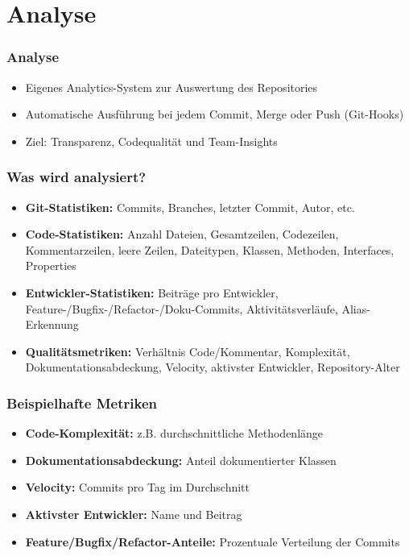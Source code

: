 \documentclass{beamer}
\begin{document}
\section{Analyse}
\begin{frame}
\frametitle{Analyse}

\begin{itemize}
  \item Eigenes Analytics-System zur Auswertung des Repositories
  \item Automatische Ausführung bei jedem Commit, Merge oder Push (Git-Hooks)
  \item Ziel: Transparenz, Codequalität und Team-Insights
\end{itemize}
\end{frame}

\begin{frame}
\frametitle{Was wird analysiert?}
\begin{itemize}
  \item \textbf{Git-Statistiken:} Commits, Branches, letzter Commit, Autor, etc.
  \item \textbf{Code-Statistiken:} Anzahl Dateien, Gesamtzeilen, Codezeilen, Kommentarzeilen, leere Zeilen, Dateitypen, Klassen, Methoden, Interfaces, Properties
  \item \textbf{Entwickler-Statistiken:} Beiträge pro Entwickler, Feature-/Bugfix-/Refactor-/Doku-Commits, Aktivitätsverläufe, Alias-Erkennung
  \item \textbf{Qualitätsmetriken:} Verhältnis Code/Kommentar, Komplexität, Dokumentationsabdeckung, Velocity, aktivster Entwickler, Repository-Alter
\end{itemize}
\end{frame}

\begin{frame}
\frametitle{Beispielhafte Metriken}
\begin{itemize}
  \item \textbf{Code-Komplexität:} z.B. durchschnittliche Methodenlänge
  \item \textbf{Dokumentationsabdeckung:} Anteil dokumentierter Klassen
  \item \textbf{Velocity:} Commits pro Tag im Durchschnitt
  \item \textbf{Aktivster Entwickler:} Name und Beitrag
  \item \textbf{Feature/Bugfix/Refactor-Anteile:} Prozentuale Verteilung der Commits
\end{itemize}
\end{frame}
\end{document}
